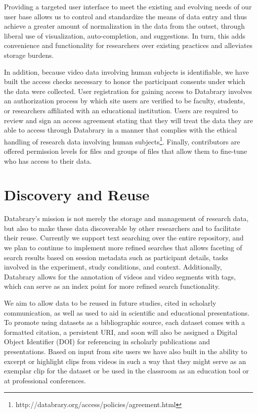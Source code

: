 \documentclass{sig-alternate}
\begin{document}
Providing a targeted user interface to meet the existing and evolving needs of our user base allows us to control and standardize the means of data entry and thus achieve a greater amount of normalization in the data from the outset, through liberal use of visualization, auto-completion, and suggestions.
In turn, this adds convenience and functionality for researchers over existing practices and alleviates storage burdens.

In addition, because video data involving human subjects is identifiable, we have built the access checks necessary to honor the participant consents under which the data were collected. 
User registration for gaining access to Databrary involves an authorization process by which site users are verified to be faculty, students, or researchers affiliated with an educational institution.
Users are required to review and sign an access agreement stating that they will treat the data they are able to access through Databrary in a manner that complies with the ethical handling of research data involving human subjects\footnote{http://databrary.org/access/policies/agreement.html}.
Finally, contributors are offered permission levels for files and groups of files that allow them to fine-tune who has access to their data. 

\section{Discovery and Reuse}

Databrary's mission is not merely the storage and management of research data, but also to make these data discoverable by other researchers and to facilitate their reuse.
Currently we support text searching over the entire repository, and we plan to continue to implement more refined searches that allows faceting of search results based on session metadata such as participant details, tasks involved in the experiment, study conditions, and context.
Additionally, Databrary allows for the annotation of videos and video segments with tags, which can serve as an index point for more refined search functionality.  

We aim to allow data to be reused in future studies, cited in scholarly communication, as well as used to aid in scientific and educational presentations.
To promote using datasets as a bibliographic source, each dataset comes with a formatted citation, a persistent URI, and soon will also be assigned a Digital Object Identifier (DOI) for referencing in scholarly publications and presentations.
Based on input from site users we have also built in the ability to excerpt or highlight clips from videos in such a way that they might serve as an exemplar clip for the dataset or be used in the classroom as an education tool or at professional conferences.
\end{document}
